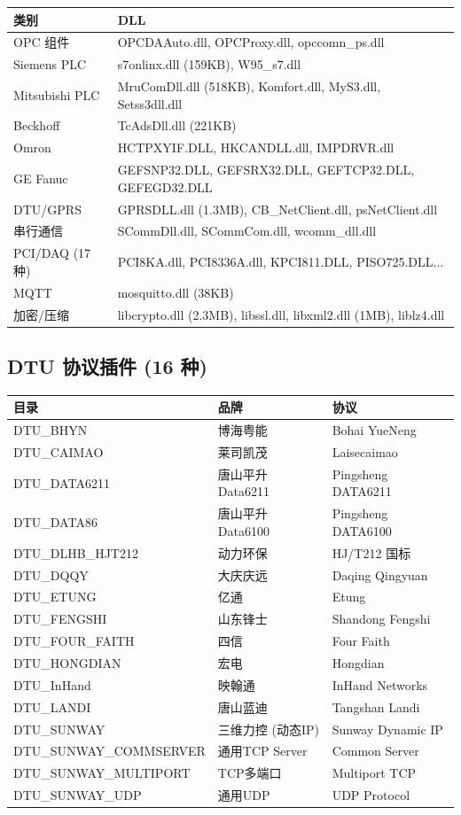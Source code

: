 \documentclass[12pt,a4paper]{ctexart}
\begin{document}
\begin{longtable}{p{4cm}p{7cm}}
\toprule
\textbf{类别} & \textbf{DLL} \\
\midrule
OPC 组件 & OPCDAAuto.dll, OPCProxy.dll, opccomn\_ps.dll \\
Siemens PLC & s7onlinx.dll (159KB), W95\_s7.dll \\
Mitsubishi PLC & MruComDll.dll (518KB), Komfort.dll, MyS3.dll, Setss3dll.dll \\
Beckhoff & TcAdsDll.dll (221KB) \\
Omron & HCTPXYIF.DLL, HKCANDLL.dll, IMPDRVR.dll \\
GE Fanuc & GEFSNP32.DLL, GEFSRX32.DLL, GEFTCP32.DLL, GEFEGD32.DLL \\
DTU/GPRS & GPRSDLL.dll (1.3MB), CB\_NetClient.dll, psNetClient.dll \\
串行通信 & SCommDll.dll, SCommCom.dll, wcomm\_dll.dll \\
PCI/DAQ (17 种) & PCI8KA.dll, PCI8336A.dll, KPCI811.DLL, PISO725.DLL... \\
MQTT & mosquitto.dll (38KB) \\
加密/压缩 & libcrypto.dll (2.3MB), libssl.dll, libxml2.dll (1MB), liblz4.dll \\
\bottomrule
\end{longtable}

\subsection{DTU 协议插件 (16 种)}

\begin{longtable}{p{4cm}p{4.5cm}p{5cm}}
\toprule
\textbf{目录} & \textbf{品牌} & \textbf{协议} \\
\midrule
DTU\_BHYN & 博海粤能 & Bohai YueNeng \\
DTU\_CAIMAO & 莱司凯茂 & Laisecaimao \\
DTU\_DATA6211 & 唐山平升 Data6211 & Pingsheng DATA6211 \\
DTU\_DATA86 & 唐山平升 Data6100 & Pingsheng DATA6100 \\
DTU\_DLHB\_HJT212 & 动力环保 & HJ/T212 国标 \\
DTU\_DQQY & 大庆庆远 & Daqing Qingyuan \\
DTU\_ETUNG & 亿通 & Etung \\
DTU\_FENGSHI & 山东锋士 & Shandong Fengshi \\
DTU\_FOUR\_FAITH & 四信 & Four Faith \\
DTU\_HONGDIAN & 宏电 & Hongdian \\
DTU\_InHand & 映翰通 & InHand Networks \\
DTU\_LANDI & 唐山蓝迪 & Tangshan Landi \\
DTU\_SUNWAY & 三维力控 (动态IP) & Sunway Dynamic IP \\
DTU\_SUNWAY\_COMMSERVER & 通用TCP Server & Common Server \\
DTU\_SUNWAY\_MULTIPORT & TCP多端口 & Multiport TCP \\
DTU\_SUNWAY\_UDP & 通用UDP & UDP Protocol \\
\bottomrule
\end{longtable}
\end{document}
